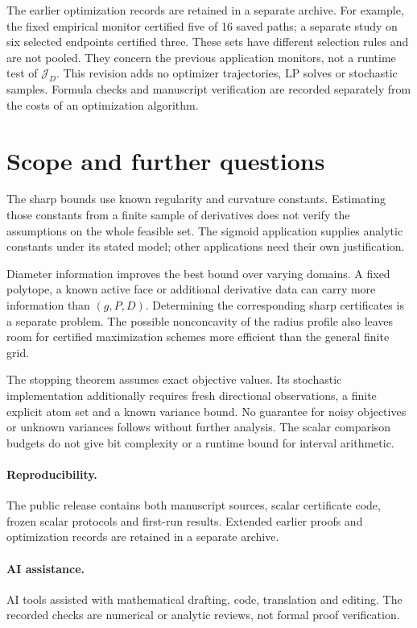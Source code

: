 The earlier optimization records are retained in a separate archive.
For example, the fixed empirical monitor certified five of 16 saved
paths; a separate study on six selected endpoints certified three.
These sets have different selection rules and are not pooled.
They concern the previous application monitors, not a runtime test of
$\mathcal J_D$. This revision adds no optimizer trajectories, LP solves
or stochastic samples. Formula checks and manuscript verification are
recorded separately from the costs of an optimization algorithm.

\section{Scope and further questions}
The sharp bounds use known regularity and curvature constants.
Estimating those constants from a finite sample of derivatives does
not verify the assumptions on the whole feasible set. The sigmoid
application supplies analytic constants under its stated model;
other applications need their own justification.

Diameter information improves the best bound over varying domains.
A fixed polytope, a known active face or additional derivative data can
carry more information than $(g,P,D)$. Determining the corresponding
sharp certificates is a separate problem. The possible nonconcavity
of the radius profile also leaves room for certified maximization
schemes more efficient than the general finite grid.

The stopping theorem assumes exact objective values. Its stochastic
implementation additionally requires fresh directional observations,
a finite explicit atom set and a known variance bound. No guarantee
for noisy objectives or unknown variances follows without further
analysis. The scalar comparison budgets do not give bit complexity
or a runtime bound for interval arithmetic.

\paragraph{Reproducibility.}
The public release contains both manuscript sources, scalar certificate
code, frozen scalar protocols and first-run results. Extended earlier
proofs and optimization records are retained in a separate archive.

\paragraph{AI assistance.}
AI tools assisted with mathematical drafting, code, translation and
editing. The recorded checks are numerical or analytic reviews, not
formal proof verification.
